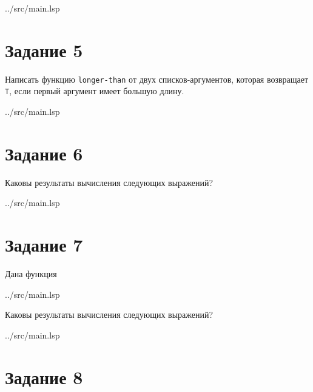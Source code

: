\begin{lstinputlisting}[
	caption={Задание 4},
	label={lst:t4},
	style={lsp},
	linerange={24-31},
	]{../src/main.lsp}
\end{lstinputlisting}

\section*{Задание 5}

Написать функцию {\texttt{longer-than}} от двух списков-аргументов, которая возвращает {\texttt{T}}, если первый аргумент имеет большую длину.

\begin{lstinputlisting}[
	caption={Задание 5},
	label={lst:t5},
	style={lsp},
	linerange={34-38},
	]{../src/main.lsp}
\end{lstinputlisting}

\section*{Задание 6}

Каковы результаты вычисления следующих выражений?

\begin{lstinputlisting}[
	caption={Задание 6},
	label={lst:t6},
	style={lsp},
	linerange={42-48},
	]{../src/main.lsp}
\end{lstinputlisting}

\section*{Задание 7}

Дана функция 

\begin{lstinputlisting}[
	caption={mystery},
	label={lst:func},
	style={lsp},
	linerange={50-51},
	]{../src/main.lsp}
\end{lstinputlisting}

Каковы результаты вычисления следующих выражений?

\begin{lstinputlisting}[
	caption={Задание 7},
	label={lst:t7},
	style={lsp},
	linerange={53-56},
	]{../src/main.lsp}
\end{lstinputlisting}

\section*{Задание 8}

